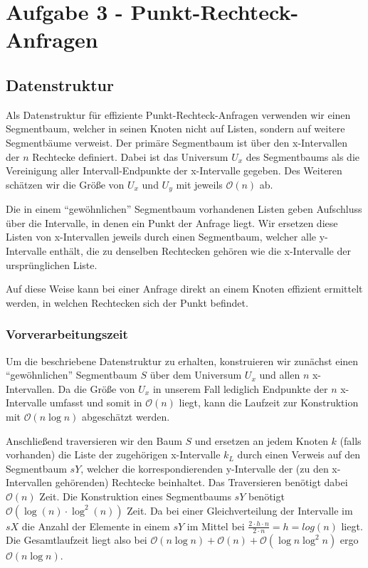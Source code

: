 \documentclass[a4paper]{article}
\begin{document}
\section*{Aufgabe 3 - Punkt-Rechteck-Anfragen}

\subsection*{Datenstruktur}
Als Datenstruktur für effiziente Punkt-Rechteck-Anfragen verwenden wir einen Segmentbaum, 
welcher in seinen Knoten nicht auf Listen, sondern auf weitere Segmentbäume verweist.
Der primäre Segmentbaum ist über den x-Intervallen der $n$ Rechtecke definiert. 
Dabei ist das Universum $U_x$ des Segmentbaums als die Vereinigung aller Intervall-Endpunkte
der x-Intervalle gegeben. Des Weiteren schätzen wir die Größe von $U_x$ und $U_y$ mit jeweils $\mathcal{O}(n)$ ab.

Die in einem "`gewöhnlichen"' Segmentbaum vorhandenen Listen geben Aufschluss über die 
Intervalle, in denen ein Punkt der Anfrage liegt. Wir ersetzen diese Listen von 
x-Intervallen jeweils durch einen Segmentbaum, welcher alle y-Intervalle enthält, 
die zu denselben Rechtecken gehören wie die x-Intervalle der ursprünglichen Liste.

Auf diese Weise kann bei einer Anfrage direkt an einem Knoten effizient ermittelt werden, 
in welchen Rechtecken sich der Punkt befindet. 


\subsubsection*{Vorverarbeitungszeit}
Um die beschriebene Datenstruktur zu erhalten, konstruieren wir zunächst einen
"`gewöhnlichen"' Segmentbaum $S$ über dem Universum $U_x$ und allen 
$n$ x-Intervallen. Da die Größe von $U_x$ in unserem Fall 
lediglich Endpunkte der $n$ x-Intervalle umfasst und somit in $\mathcal{O}(n)$ liegt, 
kann die Laufzeit zur Konstruktion mit $\mathcal{O}(n \log n)$ abgeschätzt werden.

Anschließend traversieren wir den Baum $S$ und ersetzen an jedem Knoten $k$ (falls vorhanden)
die Liste der zugehörigen x-Intervalle $k_L$ durch einen Verweis auf 
den Segmentbaum $sY$, welcher die korrespondierenden y-Intervalle der (zu den x-Intervallen 
gehörenden) Rechtecke beinhaltet. Das Traversieren benötigt dabei $\mathcal{O}(n)$ Zeit.
Die Konstruktion eines Segmentbaums $sY$ benötigt $\mathcal{O}(\log(n) \cdot \log^2(n))$ Zeit. Da bei einer Gleichverteilung der Intervalle im $sX$ die Anzahl der Elemente in einem $sY$ im Mittel bei $\frac{2 \cdot h  \cdot n}{2 \cdot n} = h = log(n)$ liegt.
Die Gesamtlaufzeit liegt also bei $\mathcal{O}(n \log n) + \mathcal{O}(n) + \mathcal{O}(\log n \log^2 n)$ ergo $\mathcal{O}(n \log n)$. 
\end{document}
